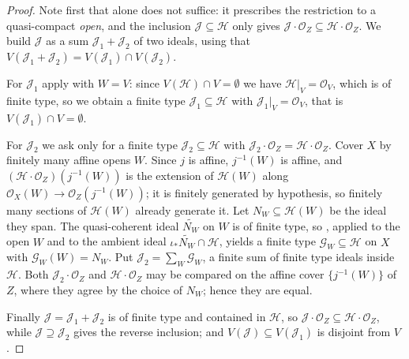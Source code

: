 \begin{proof}
  \leanok
  Note first that  alone
  does not suffice: it prescribes the restriction to a quasi-compact
  \emph{open}, and the inclusion $\mathcal J\subseteq\mathcal H$ only gives
  $\mathcal J\cdot\mathcal O_Z\subseteq\mathcal H\cdot\mathcal O_Z$.  We
  build $\mathcal J$ as a sum $\mathcal J_1+\mathcal J_2$ of two ideals, using
  that $V(\mathcal J_1+\mathcal J_2)=V(\mathcal J_1)\cap V(\mathcal J_2)$.

  For $\mathcal J_1$ apply
   with $W=V$: since
  $V(\mathcal H)\cap V=\emptyset$ we have $\mathcal H|_V=\mathcal O_V$,
  which is of finite type, so we obtain a finite type
  $\mathcal J_1\subseteq\mathcal H$ with $\mathcal J_1|_V=\mathcal O_V$,
  that is $V(\mathcal J_1)\cap V=\emptyset$.

  For $\mathcal J_2$ we ask only for a finite type
  $\mathcal J_2\subseteq\mathcal H$ with
  $\mathcal J_2\cdot\mathcal O_Z=\mathcal H\cdot\mathcal O_Z$.  Cover $X$
  by finitely many affine opens $W$.  Since $j$ is affine, $j^{-1}(W)$ is
  affine, and $(\mathcal H\cdot\mathcal O_Z)(j^{-1}(W))$ is the extension of
  $\mathcal H(W)$ along $\mathcal O_X(W)\to\mathcal O_Z(j^{-1}(W))$; it is
  finitely generated by hypothesis, so finitely many sections of
  $\mathcal H(W)$ already generate it.  Let $N_W\subseteq\mathcal H(W)$ be
  the ideal they span.  The quasi-coherent ideal $\widetilde{N_W}$ on $W$ is of
  finite type, so ,
  applied to the open $W$ and to the ambient ideal
  $\iota_*\widetilde{N_W}\cap\mathcal H$, yields a finite type
  $\mathcal G_W\subseteq\mathcal H$ on $X$ with $\mathcal G_W(W)=N_W$.  Put
  $\mathcal J_2=\sum_W\mathcal G_W$, a finite sum of finite type ideals
  inside $\mathcal H$.  Both $\mathcal J_2\cdot\mathcal O_Z$ and
  $\mathcal H\cdot\mathcal O_Z$ may be compared on the affine cover
  $\{j^{-1}(W)\}$ of $Z$, where they agree by the choice of $N_W$; hence they
  are equal.

  Finally $\mathcal J=\mathcal J_1+\mathcal J_2$ is of finite type and
  contained in $\mathcal H$, so
  $\mathcal J\cdot\mathcal O_Z\subseteq\mathcal H\cdot\mathcal O_Z$, while
  $\mathcal J\supseteq\mathcal J_2$ gives the reverse inclusion; and
  $V(\mathcal J)\subseteq V(\mathcal J_1)$ is disjoint from $V$.
\end{proof}


